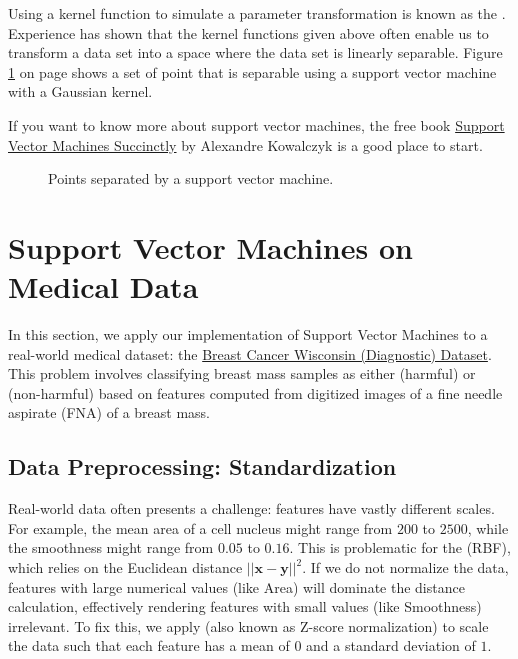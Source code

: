 Using a kernel function to simulate a parameter transformation is known as the
.    
Experience has shown that the kernel functions given above often enable us to transform a data set into a space where the
data set is linearly separable.  Figure \ref{fig:strange-data.pdf} on page \pageref{fig:strange-data.pdf} shows
a set of point that is separable using a support vector machine with a Gaussian kernel.


If you want to know more about support vector machines, the free book
\href{https://www.syncfusion.com/ebooks/support_vector_machines_succinctly}{Support Vector Machines Succinctly}
by Alexandre Kowalczyk \cite{kowalczyk:2017} is a good place to start.

\begin{figure}[!th]
\caption{Points separated by a support vector machine.}
\label{fig:strange-data.pdf}
\end{figure}
\pagebreak

\section{Support Vector Machines on Medical Data}

In this section, we apply our implementation of Support Vector Machines to a real-world medical dataset: the \href{https://archive.ics.uci.edu/ml/datasets/breast+cancer+wisconsin+(diagnostic)}{Breast Cancer Wisconsin (Diagnostic) Dataset}.
This problem involves classifying breast mass samples as either  (harmful) or  (non-harmful) based on features computed from digitized images of a fine needle aspirate (FNA) of a breast mass.

\subsection{Data Preprocessing: Standardization}
Real-world data often presents a challenge: features have vastly different scales. For example, the mean area of a cell nucleus might range from $200$ to $2500$, while the smoothness might range from $0.05$ to $0.16$.
This is problematic for the  (RBF), which relies on the Euclidean distance $||\mathbf{x} - \mathbf{y}||^2$.
If we do not normalize the data, features with large numerical values (like Area) will dominate the distance calculation, effectively rendering features with small values (like Smoothness) irrelevant.
To fix this, we apply  (also known as Z-score normalization) to scale the data such that each feature has a mean of $0$ and a standard deviation of $1$.

